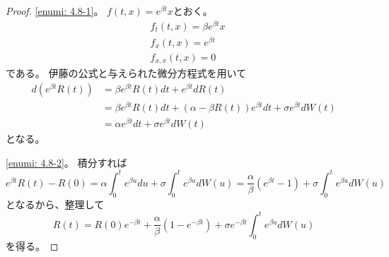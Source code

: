 \documentclass[uplatex]{jsarticle}
\theoremstyle{definition}
\begin{document}
\begin{proof}
  \ref{enumi: 4.8-1}。
  \(f(t,x) = e^{\beta t}x\)とおく。
  \begin{align*}
    &f_t(t,x) = \beta e^{\beta t}x \\
    &f_x(t,x) = e^{\beta t} \\
    &f_{x,x}(t,x) = 0
  \end{align*}
  である。
  伊藤の公式と与えられた微分方程式を用いて
  \begin{align*}
    d\left( e^{\beta t}R(t)\right)
    &= \beta e^{\beta t}R(t)dt + e^{\beta t}dR(t) \\
    &= \beta e^{\beta t}R(t)dt
    + \left( \alpha-\beta R(t) \right) e^{\beta t}dt
    + \sigma e^{\beta t} dW(t) \\
    &= \alpha e^{\beta t}dt
    + \sigma e^{\beta t} dW(t)
  \end{align*}
  となる。

  \ref{enumi: 4.8-2}。
  積分すれば
  \[
  e^{\beta t}R(t) - R(0)
  = \alpha \int_0^t e^{\beta u}du
  + \sigma \int_0^t e^{\beta u} dW(u)
  = \frac{\alpha}{\beta} (e^{\beta t} - 1)
  + \sigma \int_0^t e^{\beta u} dW(u)
  \]
  となるから、整理して
  \[
  R(t) = R(0)e^{-\beta t} + \frac{\alpha}{\beta} (1 - e^{-\beta t})
  + \sigma e^{-\beta t}\int_0^te^{\beta u}dW(u)
  \]
  を得る。
\end{proof}
\end{document}
